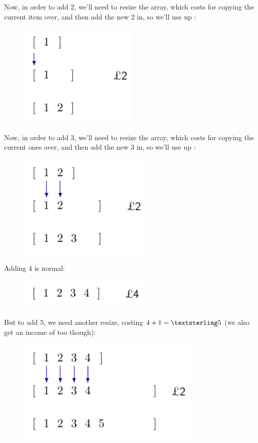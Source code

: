 Now, in order to add 2, we'll need to resize the array, which costs
 for copying the current item over, and then add the new 2 in, so
we'll use up :

\begin{figure}[H]
  \centering
  \includegraphics[height=50mm]{diagrams/banker2.pdf}
  \label{banker2}
\end{figure}

Now, in order to add 3, we'll need to resize the array, which costs
 for copying the current ones over, and then add the new 3 in, so
we'll use up :

\begin{figure}[H]
  \centering
  \includegraphics[height=50mm]{diagrams/banker3.pdf}
  \label{banker3}
\end{figure}

Adding 4 is normal:

\begin{figure}[H]
  \centering
  \includegraphics[height=15mm]{diagrams/banker4.pdf}
  \label{banker4}
\end{figure}

But to add 5, we need another resize, costing $4 + 1 = \textsterling 5$ (we also
get an income of  too though):

\begin{figure}[H]
  \centering
  \includegraphics[height=50mm]{diagrams/banker5.pdf}
  \label{banker5}
\end{figure}

